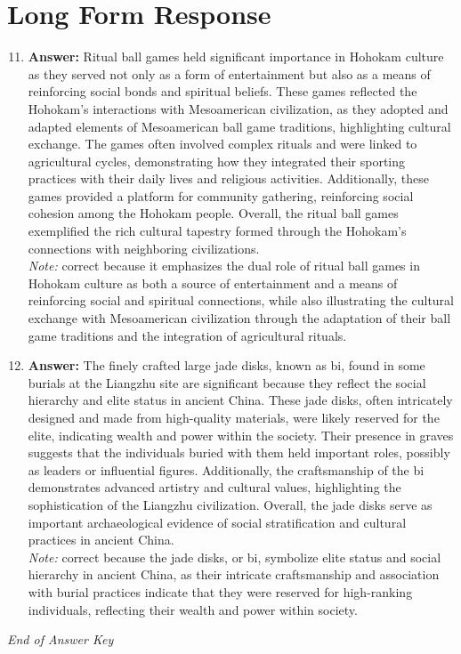 \documentclass[12pt]{article}
\begin{document}
\section*{Long Form Response}
\begin{enumerate}[label=\arabic*.]
\setcounter{enumi}{10}
\item \textbf{Answer:} Ritual ball games held significant importance in Hohokam culture as they served not only as a form of entertainment but also as a means of reinforcing social bonds and spiritual beliefs. These games reflected the Hohokam's interactions with Mesoamerican civilization, as they adopted and adapted elements of Mesoamerican ball game traditions, highlighting cultural exchange. The games often involved complex rituals and were linked to agricultural cycles, demonstrating how they integrated their sporting practices with their daily lives and religious activities. Additionally, these games provided a platform for community gathering, reinforcing social cohesion among the Hohokam people. Overall, the ritual ball games exemplified the rich cultural tapestry formed through the Hohokam's connections with neighboring civilizations.
\\ \textit{Note:} correct because it emphasizes the dual role of ritual ball games in Hohokam culture as both a source of entertainment and a means of reinforcing social and spiritual connections, while also illustrating the cultural exchange with Mesoamerican civilization through the adaptation of their ball game traditions and the integration of agricultural rituals.
\item \textbf{Answer:} The finely crafted large jade disks, known as bi, found in some burials at the Liangzhu site are significant because they reflect the social hierarchy and elite status in ancient China. These jade disks, often intricately designed and made from high-quality materials, were likely reserved for the elite, indicating wealth and power within the society. Their presence in graves suggests that the individuals buried with them held important roles, possibly as leaders or influential figures. Additionally, the craftsmanship of the bi demonstrates advanced artistry and cultural values, highlighting the sophistication of the Liangzhu civilization. Overall, the jade disks serve as important archaeological evidence of social stratification and cultural practices in ancient China.
\\ \textit{Note:} correct because the jade disks, or bi, symbolize elite status and social hierarchy in ancient China, as their intricate craftsmanship and association with burial practices indicate that they were reserved for high-ranking individuals, reflecting their wealth and power within society.
\end{enumerate}

\vfill
\noindent\textit{End of Answer Key}
\end{document}
